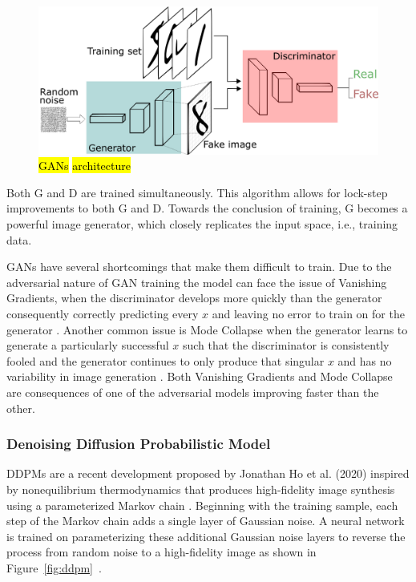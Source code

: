 \documentclass[technologies,article,accept,pdftex,moreauthors]{Definitions/mdpi}
\newcommand{\figref}[1]{Figure~\ref{#1}}
\begin{document}
\begin{figure}[H]
    \includegraphics[width=\columnwidth]{GANs.png}
    \caption{\label{fig:ganarch}\hl{GANs} %
 \hl{architecture}}
\end{figure}



Both G and D are trained simultaneously. This algorithm allows for lock-step improvements to both G and D. Towards the conclusion of training, G becomes a powerful image generator, which closely replicates the input space, i.e., training data.


GANs have several shortcomings that make them difficult to train. Due to the adversarial nature of GAN training the model can face the issue of Vanishing Gradients, when the discriminator develops more quickly than the generator consequently correctly predicting every $x$ and leaving no error to train on for the generator \cite{google}. Another common issue is Mode Collapse when the generator learns to generate a particularly successful $x$ such that the discriminator is consistently fooled and the generator continues to only produce that singular $x$ and has no variability in image generation \cite{google}. Both Vanishing Gradients and Mode Collapse are consequences of one of the adversarial models improving faster than the other.


\subsubsection{Denoising Diffusion Probabilistic Model}

DDPMs are a recent development proposed by Jonathan Ho et al. (2020) inspired by nonequilibrium thermodynamics that produces high-fidelity image synthesis using a parameterized Markov chain \cite{ho2020denoising}. Beginning with the training sample, each step of the Markov chain adds a single layer of Gaussian noise. A neural network is trained on parameterizing these additional Gaussian noise layers to reverse the process from random noise to a high-fidelity image as shown in \figref{fig:ddpm}~\cite{ho2020denoising}.
\end{document}
